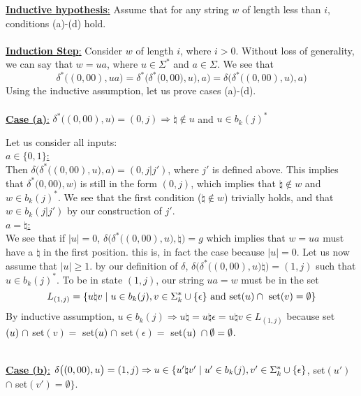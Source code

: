 \documentclass[11pt]{article}
\begin{document}
\underline{\textbf{Inductive hypothesis}:} Assume that for any string $w$ of length less than $i$, conditions (a)-(d) hold. \\ \\
\underline{\textbf{Induction Step}:} Consider $w$ of length $i$, where $i>0$. Without loss of generality, we can say that $w=ua$, where $u\in\Sigma^*$ and $a\in\Sigma$. We see that
\[\delta^*\big((0,00),ua\big)=\delta^*\Big(\delta^*\big(0,00),u\big),a\Big)=\delta\Big(\delta^*\big((0,00),u\big),a\Big)\]
Using the inductive assumption, let us prove cases (a)-(d). \\ \\
\underline{\textbf{Case (a)}:} $\delta^*\big((0,00),u\big)=(0,j)\Rightarrow\natural\notin u$ and $u\in b_k(j)^*$ \\
\begin{addmargin}[2em]{0em}
Let us consider all inputs: \\
\underline{$a\in\{0,1\}$:} \\
Then $\delta\Big(\delta^*\big((0,00),u\big),a\Big)=(0,j|j')$, where $j'$ is defined above. This implies that $\delta^*\big(0,00),w\big)$ is still in the form $(0,j)$, which implies that $\natural\notin w$ and $w\in b_k(j)^*$. We see that the first condition ($\natural\notin w$) trivially holds, and that $w\in b_k(j|j')$ by our construction of $j'$.
\newpage \ \\
\underline{$a=\natural$:} \\
We see that if $|u|=0$, $\delta\Big(\delta^*\big((0,00),u\big),\natural\Big)=g$ which implies that $w=ua$ must have a $\natural$ in the first position. this is, in fact the case because $|u|=0$. Let us now assume that $|u|\geq1$. by our definition of $\delta$, $\delta\Big(\delta^*\big((0,00),u\big)\natural\Big)=(1,j)$ such that $u\in b_k(j)^*$. To be in state $(1,j)$, our string $ua=w$ must be in the set
\[L_{(1,j)}=\{u\natural v\hspace{1mm}|\hspace{1mm}u\in b_k(j),v\in\Sigma_k^*\cup\{\epsilon\}\text{ and set}(u)\cap\text{ set}(v)=\emptyset\}\]
By inductive assumption, $u\in b_k(j)\Rightarrow u\natural = u\natural\epsilon=u\natural v\in L_{(1,j)}$ because set$(u)\hspace{1mm}\cap$ set$(v)=$ set$(u)\hspace{1mm}\cap$ set$(\epsilon)=$ set$(u)\hspace{1mm}\cap\emptyset=\emptyset$.
\end{addmargin}
\ \\
\underline{\textbf{Case (b)}:} $\delta\big((0,00),u\big)=(1,j)\Rightarrow u\in\{u'\natural v'\hspace{1mm}|\hspace{1mm}u'\in b_k(j),v'\in\Sigma_k^*\cup\{\epsilon\}$, set$(u')$ $\cap$ set$(v')=\emptyset\}$.
\end{document}

